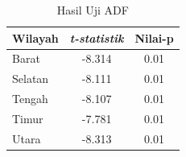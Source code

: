 \begin{table}[H]
    \centering
    \caption{Hasil Uji ADF}
    \label{table:hasil-uji-adf-starima}
    \renewcommand{\arraystretch}{1.2}
    \begin{tabular}{lcc}
        \toprule
        \textbf{Wilayah} & \textit{t-statistik} & \textbf{Nilai-p} \\
        \midrule
        Barat   & -8.314 & 0.01 \\
        Selatan & -8.111 & 0.01 \\
        Tengah  & -8.107 & 0.01 \\
        Timur   & -7.781 & 0.01 \\
        Utara   & -8.313 & 0.01 \\
        \bottomrule
    \end{tabular}
\end{table}